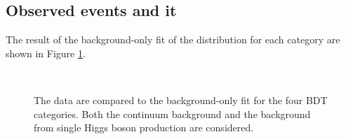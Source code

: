 \subsection{Observed events and \texorpdfstring{\myy} fit}
\label{HHyybb:Results:Fit}
The result of the background-only fit of the \myy distribution for each category are shown in Figure \ref{fig:HHyybb:Results:Fit:myy}. 
\begin{figure}[htbp]
    \centering
     \\
    \caption{The data are compared to the background-only fit for the four BDT categories. Both the continuum background and the background from single Higgs boson production are considered.}
    \label{fig:HHyybb:Results:Fit:myy}
\end{figure}
